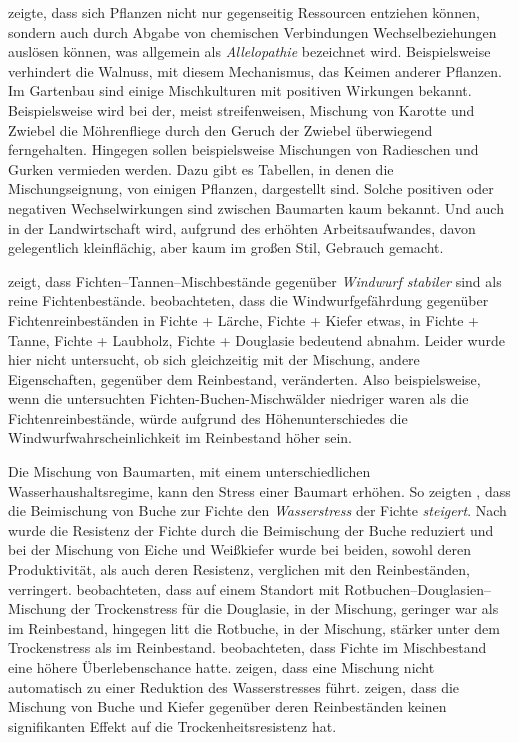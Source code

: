 \documentclass[twocolumn]{scrartcl}
\begin{document}
\cite{molisch1937allelopathie} zeigte, dass sich Pflanzen nicht nur
gegenseitig Ressourcen entziehen können, sondern auch durch Abgabe von
chemischen Verbindungen Wechselbeziehungen auslösen können, was
allgemein als \emph{Allelopathie} bezeichnet wird. Beispielsweise
verhindert die Walnuss, mit diesem Mechanismus, das Keimen anderer
Pflanzen. Im Gartenbau sind einige Mischkulturen mit positiven
Wirkungen bekannt. Beispielsweise wird bei der, meist streifenweisen,
Mischung von Karotte und Zwiebel die Möhrenfliege durch den Geruch der
Zwiebel überwiegend ferngehalten. Hingegen sollen beispielsweise
Mischungen von Radieschen und Gurken vermieden werden. Dazu gibt es
Tabellen, in denen die Mischungseignung, von einigen Pflanzen,
dargestellt sind. Solche positiven oder negativen Wechselwirkungen
sind zwischen Baumarten kaum bekannt. Und auch in der Landwirtschaft
wird, aufgrund des erhöhten Arbeitsaufwandes, davon gelegentlich
kleinflächig, aber kaum im großen Stil, Gebrauch gemacht.

\cite{schmidtVogt1987Sturmstabilitaet} zeigt, dass
Fichten--Tannen--Mischbestände gegenüber \emph{Windwurf stabiler} sind
als reine Fichtenbestände. \cite{schuetz2006stabilitaetMischbestand}
beobachteten, dass die Windwurfgefährdung gegenüber
Fichtenreinbeständen in Fichte + Lärche, Fichte + Kiefer etwas, in
Fichte + Tanne, Fichte + Laubholz, Fichte + Douglasie bedeutend
abnahm. Leider wurde hier nicht untersucht, ob sich gleichzeitig mit
der Mischung, andere Eigenschaften, gegenüber dem Reinbestand,
veränderten. Also beispielsweise, wenn die untersuchten
Fichten-Buchen-Mischwälder niedriger waren als die
Fichtenreinbestände, würde aufgrund des Höhenunterschiedes die
Windwurfwahrscheinlichkeit im Reinbestand höher sein.

Die Mischung von Baumarten, mit einem unterschiedlichen
Wasserhaushaltsregime, kann den Stress einer Baumart erhöhen. So
zeigten \cite{schume2004wasserFichteBuche}, dass die Beimischung von
Buche zur Fichte den \emph{Wasserstress} der Fichte
\emph{steigert}. Nach \cite{nothdurft2020mischbestand} wurde die
Resistenz der Fichte durch die Beimischung der Buche reduziert und bei
der Mischung von Eiche und Weißkiefer wurde bei beiden, sowohl deren
Produktivität, als auch deren Resistenz, verglichen mit den
Reinbeständen, verringert. \cite{thurm2016mischungDougBuStress}
beobachteten, dass auf einem Standort mit
Rotbuchen--Douglasien--Mischung der Trockenstress für die Douglasie,
in der Mischung, geringer war als im Reinbestand, hingegen litt die
Rotbuche, in der Mischung, stärker unter dem Trockenstress als im
Reinbestand. \cite{neuner2015FichteAusfall} beobachteten, dass Fichte
im Mischbestand eine höhere Überlebenschance
hatte. \cite{schnabel2022mischwaldTrockenstress} zeigen, dass eine
Mischung nicht automatisch zu einer Reduktion des Wasserstresses führt.
\cite{streel2022Mischbestand} zeigen, dass die Mischung von Buche und Kiefer
gegenüber deren Reinbeständen keinen signifikanten Effekt auf die
Trockenheitsresistenz hat.
\end{document}

